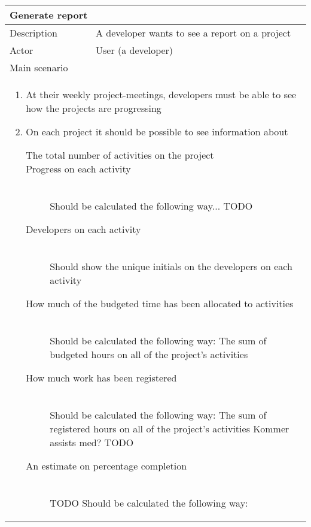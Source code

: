 \begin{table}[H]
  \begin{tabular}{|l|l|}
    \multicolumn{2}{l}{
      \bf{Generate report}
    }
    \\ \hline
    Description & A developer wants to see a report on a project
    \\ \hline
    Actor & User (a developer)
    \\ \hline \multicolumn{2}{|l|}{
      Main scenario 
    }
    \\ \hline \multicolumn{2}{|l|}{ \parbox{\textwidth}{
        \begin{enumerate}        
        \item{At their weekly project-meetings, developers must be able to see how the projects are progressing}
        \item{On each project it should be possible to see information about}
          \begin{description}
          \item[The total number of activities on the project] {}

          \item[Progress on each activity] \hfill \\
            {Should be calculated the following way... TODO}
			
			\item[Developers on each activity]\hfill \\
            {Should show the unique initials on the developers on each activity}

          \item[How much of the budgeted time has been allocated to activities]\hfill \\
            {Should be calculated the following way:
              The sum of budgeted hours on all of the project's activities}

          \item[How much work has been registered]\hfill \\
            {Should be calculated the following way:
              The sum of registered hours on all of the project's activities
              Kommer assists med? TODO}

          \item[An estimate on percentage completion]\hfill \\
            {TODO Should be calculated the following way:}


\end{description}
\end{enumerate}}}
\end{tabular}
\end{table}
